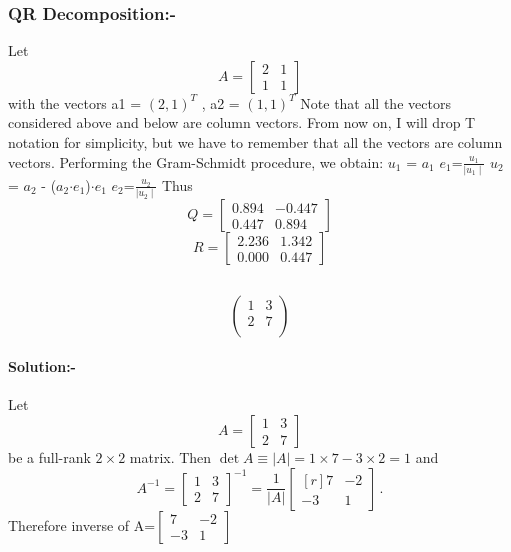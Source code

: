 \documentclass[a4paper,12pt]{article}
\begin{document}
\subsubsection{QR Decomposition:-}
Let
\[
A = \begin{bmatrix}
	2 & 1 \\ 
	1 & 1
\end{bmatrix}
\]
with the vectors a1 = $(2,1)^T$ , a2 = $(1,1)^T$
\newline
Note that all the vectors considered above and below are column vectors. From now on,
I will drop T notation for simplicity, but we have to remember that all the vectors are
column vectors.
Performing the Gram-Schmidt procedure, we obtain:
\newline
$u_1$ = $a_1$ 
\newline
$e_1$=$\frac{u_1}{\mid u_1 \mid}$
\newline
$u_2$ = $a_2$ - ($a_2$$\cdot$$e_1$)$\cdot$$e_1$
\newline
$e_2$=$\frac{u_2}{\mid u_2 \mid}$
\newline
Thus
\newline
\begin{equation}
	Q=
	\begin{bmatrix}
		0.894 & -0.447\\
		0.447 & 0.894
	\end{bmatrix}
\end{equation}
\newline
\begin{equation}
	R=
	\begin{bmatrix}
		2.236 & 1.342\\
		0.000 & 0.447
	\end{bmatrix}
\end{equation}
\subsection{}
\begin{equation}
	\begin{pmatrix}
		1 & 3\\
		2 & 7\\
	\end{pmatrix}
\end{equation}
\paragraph{Solution:-}
Let
\[
A = \begin{bmatrix}
	1 & 3 \\ 
	2 & 7
\end{bmatrix}
\]
be a full-rank $2\times2$ matrix. 
Then $\det A\equiv\lvert A\rvert=1\times{7}-3\times{2}=1$ and 
\[
A^{-1}=\begin{bmatrix}
	1 & 3 \\ 
	2 & 7
\end{bmatrix}^{-1}
=\frac{1}{\lvert A\rvert}
\begin{bmatrix*}[r]
	7 & -2 \\ 
	-3 &  1
\end{bmatrix*} \,.
\]
Therefore inverse of A=$\begin{bmatrix}
	7 & -2\\
	-3 & 1
\end{bmatrix}$
\newline
\end{document}
